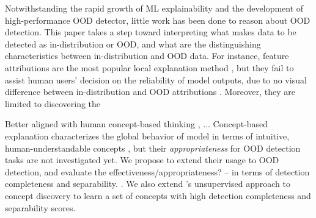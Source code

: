 
Notwithstanding the rapid growth of ML explainability and the development of high-performance OOD detector, little work has been done to reason about OOD detection.
This paper takes a step toward interpreting what makes data to be detected as in-distribution or OOD, and what are the distinguishing characteristics between in-distribution and OOD data.
For instance, feature attributions are the most popular local explanation method \citep{baehrens2009grad, simonyan2013grad, smilkov2017smoothgrad, sundararajan2017IG}, but they fail to assist human users' decision on the reliability of model outputs, due to no visual difference between in-distribution and OOD attributions \citep{adebayo2020debugging}. 
Moreover, they are limited to discovering the 

Better aligned with human concept-based thinking , ...
Concept-based explanation characterizes the global behavior of model in terms of intuitive, human-understandable concepts \citep{kim2018tcav, ghorbani2019ace, yeh2020completeness}, but their \textit{appropriateness} for OOD detection tasks are not investigated yet.
We propose to extend their usage to OOD detection, and evaluate the effectiveness/appropriateness? -- in terms of detection completeness and separability.
.
We also extend \citep{yeh2020completeness}'s unsupervised approach to concept discovery to learn a set of concepts with high detection completeness and separability scores.\\

